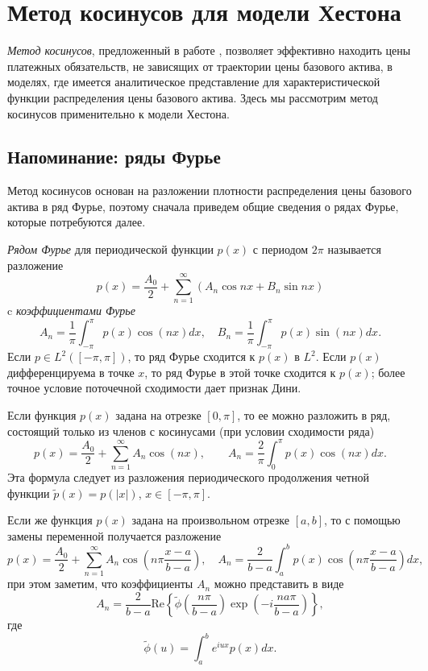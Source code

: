 \chapter{Метод косинусов для модели Хестона}
\label{ch:cos-method}

\emph{Метод косинусов}, предложенный в работе \cite{FangOosterlee09}, позволяет эффективно находить цены платежных обязательств, не зависящих от траектории цены базового актива, в моделях, где имеется аналитическое представление для характеристической функции распределения цены базового актива.
Здесь мы рассмотрим метод косинусов применительно к модели Хестона.


\section{Напоминание: ряды Фурье}

Метод косинусов основан на разложении плотности распределения цены базового актива в ряд Фурье, поэтому сначала приведем общие сведения о рядах Фурье, которые потребуются далее.

\emph{Рядом Фурье} для периодической функции $p(x)$ с периодом $2\pi$ называется разложение
\[
p(x) = \frac{A_0}{2} + \sum_{n=1}^\infty (A_n\cos nx + B_n \sin nx)
\]
c \emph{коэффициентами Фурье}
\[
A_n = \frac{1}{\pi}\int_{-\pi}^\pi p(x) \cos(nx) dx, \quad 
B_n = \frac{1}{\pi}\int_{-\pi}^\pi p(x) \sin(nx) dx.
\]
Если $p\in L^2([-\pi,\pi])$, то ряд Фурье сходится к $p(x)$ в $L^2$. Если $p(x)$ дифференцируема в точке $x$, то ряд Фурье в этой точке сходится к $p(x)$; более точное условие поточечной сходимости дает признак Дини.

Если функция $p(x)$ задана на отрезке $[0,\pi]$, то ее можно разложить в ряд, состоящий только из членов с косинусами (при условии сходимости ряда)
\[
p(x) = \frac{A_0}{2} + \sum_{n=1}^\infty A_n \cos(nx), \qquad
A_n = \frac{2}{\pi}\int_0^\pi p(x) \cos(nx) dx.
\]
Эта формула следует из разложения периодического продолжения четной функции $\tilde p(x) = p(|x|)$, $x\in[-\pi,\pi]$.

Если же функция $p(x)$ задана на произвольном отрезке $[a,b]$, то с помощью замены переменной получается разложение
\begin{equation}
\label{cos:p-fourier}
p(x) = \frac{A_0}{2} + \sum_{n=1}^\infty A_n \cos\left(n\pi\frac{x-a}{b-a}\right), \quad
A_n = \frac{2}{b-a}\int_a^b p(x) \cos\left(n\pi\frac{x-a}{b-a}\right) dx,
\end{equation}
при этом заметим, что коэффициенты $A_n$ можно представить в виде
\begin{equation}
\label{cos:A}
A_n = \frac{2}{b-a} \mathrm{Re}\left\{ \tilde\phi\left(\frac{n\pi}{b-a}\right)\exp\left(-i\frac{na\pi}{b-a}\right) \right\},
\end{equation}
где
\[
\tilde\phi(u) = \int_a^b e^{iux} p(x) dx.
\]


